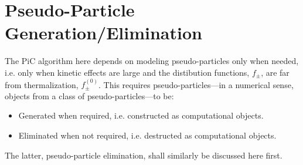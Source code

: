 \section{Pseudo-Particle Generation/Elimination}\label{cha:particle generation}
    The PiC algorithm here depends on modeling pseudo-particles only when needed, i.e. only when kinetic effects are large and the distibution functions, $f_{\pm}$, are far from thermalization, $f_{\pm}^{(0)}$. This requires pseudo-particles---in a numerical sense, objects from a class of pseudo-particles---to be:
    \begin{itemize}
        \item  Generated when required, i.e. constructed as computational objects.
        \item  Eliminated when not required, i.e. destructed as computational objects.
    \end{itemize}
    The latter, pseudo-particle elimination, shall similarly be discussed here first.
    
    
    
    
    